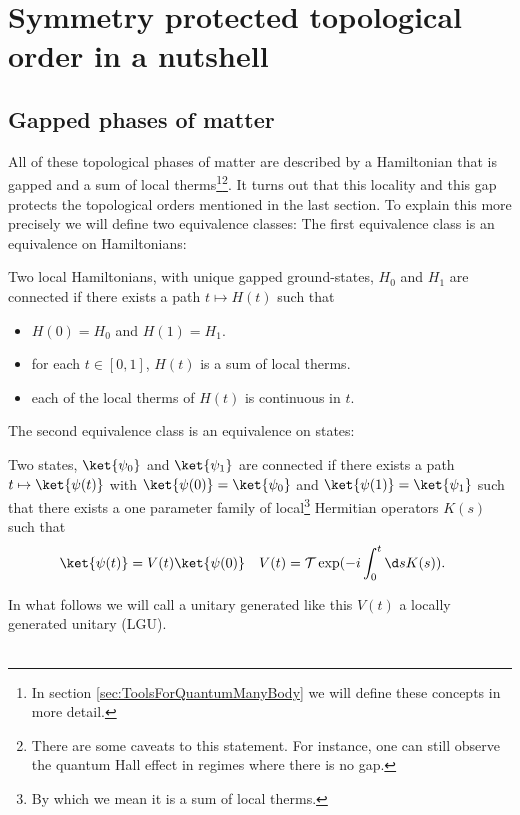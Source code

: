 \chapter{Symmetry protected topological order in a nutshell}\label{sec:SPT_Order_In_A_Nutshell}
\section{Gapped phases of matter}\label{sec:GappedPhasesOfMatterIntro}
All of these topological phases of matter are described by a Hamiltonian that is gapped and a sum of local therms\footnote{In section \ref{sec:ToolsForQuantumManyBody} we will define these concepts in more detail.}\footnote{There are some caveats to this statement. For instance, one can still observe the quantum Hall effect in regimes where there is no gap.}. It turns out that this locality and this gap protects the topological orders mentioned in the last section. To explain this more precisely we will define two equivalence classes: The first equivalence class is an equivalence on Hamiltonians:
\begin{definition}\label{def:ConnectedHamiltonians}
	Two local Hamiltonians, with unique gapped ground-states, $H_0$ and $H_1$ are connected if there exists a path $t\mapsto H(t)$ such that
	\begin{itemize}
		\item $H(0)=H_0$ and $H(1)=H_1$.
		\item for each $t\in[0,1]$, $H(t)$ is a sum of local therms.
		\item each of the local therms of $H(t)$ is continuous in $t$.
	\end{itemize}
\end{definition}
The second equivalence class is an equivalence on states:
\begin{definition}\label{def:ConnectedStates}
	Two states, $\ket{\psi_0}$ and $\ket{\psi_1}$ are connected if there exists a path $t\mapsto \ket{\psi(t)}$ with $\ket{\psi(0)}=\ket{\psi_0}$ and $\ket{\psi(1)}=\ket{\psi_1}$ such that there exists a one parameter family of local\footnote{By which we mean it is a sum of local therms.} Hermitian operators $K(s)$ such that
	\begin{align}
	\ket{\psi(t)}&=V(t)\ket{\psi(0)}&V(t)&=\mathcal{T}\exp(-i\int_{0}^{t}\d s K(s)).
	\end{align}
\end{definition}
In what follows we will call a unitary generated like this $V(t)$ a locally generated unitary (LGU).\\\\
